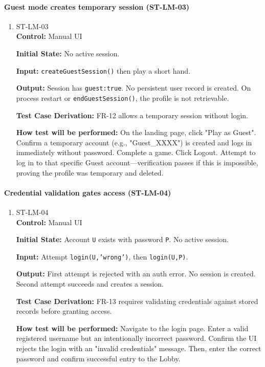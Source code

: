 \documentclass[12pt, titlepage]{article}
\begin{document}
\paragraph{Guest mode creates temporary session (ST-LM-03)}
\begin{enumerate}
\item{ST-LM-03\\}
\textbf{Control:} Manual UI

\textbf{Initial State:} No active session.

\textbf{Input:} \texttt{createGuestSession()} then play a short hand.

\textbf{Output:} Session has \texttt{guest:true}. No persistent user record is created. On process restart or \texttt{endGuestSession()}, the profile is not retrievable.

\textbf{Test Case Derivation:} FR-12 allows a temporary session without login.

\textbf{How test will be performed:} On the landing page, click "Play as Guest". Confirm a temporary account (e.g., "Guest\_XXXX") is created and logs in immediately without password. Complete a game. Click Logout. Attempt to log in to that specific Guest account—verification passes if this is impossible, proving the profile was temporary and deleted.
\end{enumerate}

\paragraph{Credential validation gates access (ST-LM-04)}
\begin{enumerate}
\item{ST-LM-04\\}
\textbf{Control:} Manual UI

\textbf{Initial State:} Account \texttt{U} exists with password \texttt{P}. No active session.

\textbf{Input:} Attempt \texttt{login(U,'wrong')}, then \texttt{login(U,P)}.

\textbf{Output:} First attempt is rejected with an auth error. No session is created. Second attempt succeeds and creates a session.

\textbf{Test Case Derivation:} FR-13 requires validating credentials against stored records before granting access.

\textbf{How test will be performed:} Navigate to the login page. Enter a valid registered username but an intentionally incorrect password. Confirm the UI rejects the login with an "invalid credentials" message. Then, enter the correct password and confirm successful entry to the Lobby.
\end{enumerate}
\end{document}
